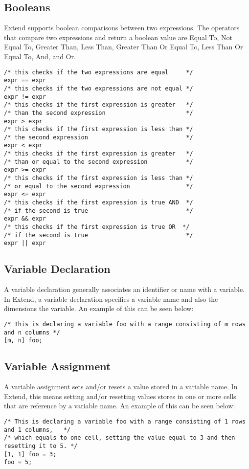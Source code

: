 	\subsection{Booleans}
		Extend supports boolean comparisons between two expressions. The operators that compare two expressions and return a boolean value are Equal To, Not Equal To, Greater Than, Less Than, Greater Than Or Equal To, Less Than Or Equal To, And, and Or. 
		\begin{lstlisting}
/* this checks if the two expressions are equal     */
expr == expr 
/* this checks if the two expressions are not equal */
expr != expr
/* this checks if the first expression is greater   */
/* than the second expression                       */
expr > expr
/* this checks if the first expression is less than */
/* the second expression                            */
expr < expr
/* this checks if the first expression is greater   */
/* than or equal to the second expression           */
expr >= expr
/* this checks if the first expression is less than */
/* or equal to the second expression                */
expr <= expr
/* this checks if the first expression is true AND  */
/* if the second is true                            */
expr && expr
/* this checks if the first expression is true OR  */
/* if the second is true                            */
expr || expr
		\end{lstlisting}
		
	\subsection{Variable Declaration}
		A variable declaration generally associates an identifier or name with a variable. In Extend, a variable declaration specifies a variable name and also the dimensions the variable. An example of this can be seen below:
		\begin{lstlisting}
/* This is declaring a variable foo with a range consisting of m rows and n columns */
[m, n] foo;
		\end{lstlisting}
	\subsection{Variable Assignment}
		A variable assignment sets and/or resets a value stored in a variable name. In Extend, this means setting and/or resetting values stores in one or more cells that are reference by a variable name. An example of this can be seen below:
		\begin{lstlisting}
/* This is declaring a variable foo with a range consisting of 1 rows and 1 columns,   */
/* which equals to one cell, setting the value equal to 3 and then resetting it to 5. */
[1, 1] foo = 3;
foo = 5;
		\end{lstlisting}
